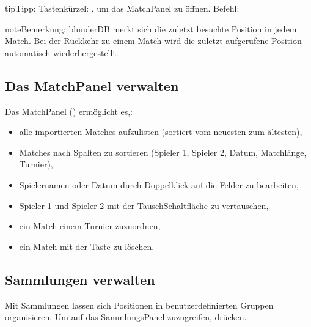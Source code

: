 \documentclass[letterpaper,10pt,german]{sphinxmanual}
\begin{document}
\begin{sphinxadmonition}{tip}{Tipp:}
\sphinxAtStartPar
Tastenkürzel: , um das Match\sphinxhyphen{}Panel zu öffnen. Befehl: 
\end{sphinxadmonition}

\begin{sphinxadmonition}{note}{Bemerkung:}
\sphinxAtStartPar
blunderDB merkt sich die zuletzt besuchte Position in jedem Match. Bei der Rückkehr zu einem Match wird die zuletzt aufgerufene Position automatisch wiederhergestellt.
\end{sphinxadmonition}


\subsection{Das Match\sphinxhyphen{}Panel verwalten}
\label{\detokenize{guide_utilisateur:gerer-le-panneau-des-matchs}}
\sphinxAtStartPar
Das Match\sphinxhyphen{}Panel () ermöglicht es,:
\begin{itemize}
\item {} 
\sphinxAtStartPar
alle importierten Matches aufzulisten (sortiert vom neuesten zum ältesten),

\item {} 
\sphinxAtStartPar
Matches nach Spalten zu sortieren (Spieler 1, Spieler 2, Datum, Matchlänge, Turnier),

\item {} 
\sphinxAtStartPar
Spielernamen oder Datum durch Doppelklick auf die Felder zu bearbeiten,

\item {} 
\sphinxAtStartPar
Spieler 1 und Spieler 2 mit der Tausch\sphinxhyphen{}Schaltfläche zu vertauschen,

\item {} 
\sphinxAtStartPar
ein Match einem Turnier zuzuordnen,

\item {} 
\sphinxAtStartPar
ein Match mit der Taste  zu löschen.

\end{itemize}


\subsection{Sammlungen verwalten}
\label{\detokenize{guide_utilisateur:gerer-les-collections}}
\sphinxAtStartPar
Mit Sammlungen lassen sich Positionen in benutzerdefinierten Gruppen organisieren. Um auf das Sammlungs\sphinxhyphen{}Panel zuzugreifen,  drücken.
\end{document}
